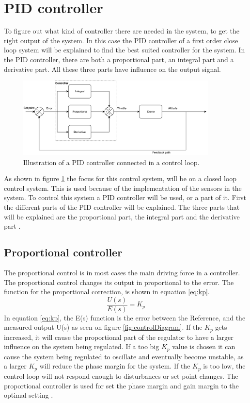 \section{PID controller}
To figure out what kind of controller there are needed in the system, to get the right output of the system. In this case the PID controller of a first order close loop system will be explained to find the best suited controller for the system. In the PID controller, there are both a proportional part, an integral part and a derivative part. All these three parts have influence on the output signal. 

\begin{figure}[H]
    \centering
    \includegraphics[width=0.9\textwidth]{figures/ch_design/PIDController/PIDControl.pdf}
    \caption{Illustration of a PID controller connected in a control loop.}
    \label{fig:PID_Controller}
\end{figure}
As shown in figure \ref{fig:PID_Controller} the focus for this control system, will be on a closed loop control system. This is used because of the implementation of the sensors in the system. To control this system a PID controller will be used, or a part of it. First the different parts of the PID controller will be explained. The three parts that will be explained are the proportional part, the integral part and the derivative part \cite{digital_control}.

\subsection*{Proportional controller}
The proportional control is in most cases the main driving force in a controller. The proportional control changes its output in proportional to the error. 
The function for the proportional correction, is shown in equation \ref{eq:kp}.
\begin{equation}\label{eq:kp}
    \frac{U(s)}{E(s)}=K_p
\end{equation}
In equation \ref{eq:kp}, the E(s) function is the error between the Reference, and the measured output U(s) as seen on figure \ref{fig:controlDiagram}.
If the $K_p$ gets increased, it will cause the proportional part of the regulator to have a larger influence on the system being regulated.
If a too big $K_p$ value is chosen it can cause the system being regulated to oscillate and eventually become unstable, as a larger $K_p$ will reduce the phase margin for the system. If the $K_p$ is too low, the control loop will not respond enough to disturbances or set point changes. The proportional controller is used for set the phase margin and gain margin to the optimal setting \cite{digital_control}. 


